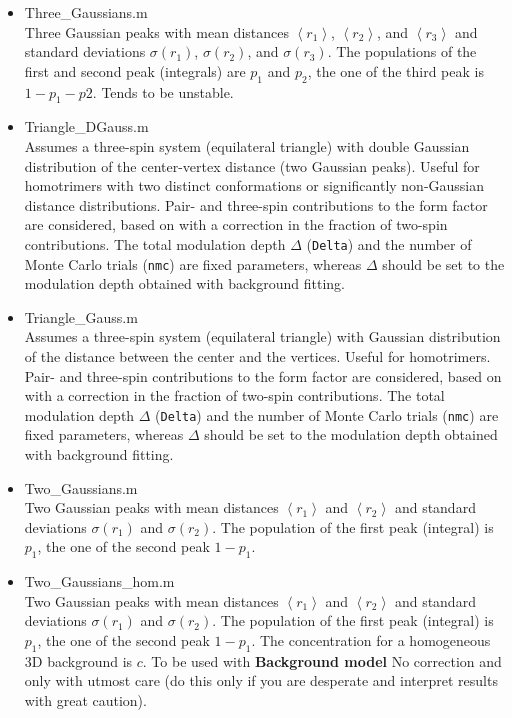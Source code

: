 \documentclass{article}
\begin{document}
\begin{itemize}
	\item {\ttfamily Three\_Gaussians.m} \\ Three Gaussian peaks with mean distances $\left\langle r_1 \right\rangle$, $\left\langle r_2 \right\rangle$, and $\left\langle r_3 \right\rangle$ and standard deviations $\sigma(r_1)$, $\sigma(r_2)$, and $\sigma(r_3)$. The populations of the first and second peak (integrals) are $p_1$ and $p_2$, the one of the third peak is $1-p_1 - p2$. Tends to be unstable.
  \item {\ttfamily Triangle\_DGauss.m} \\ Assumes a three-spin system (equilateral triangle) with double Gaussian distribution of the center-vertex distance (two Gaussian peaks). Useful for homotrimers with two distinct conformations or significantly non-Gaussian distance distributions. Pair- and three-spin contributions to the form factor are considered, based on \cite{jeschke2009} with a correction in the fraction of two-spin contributions. The total modulation depth $\Delta$ (\texttt{Delta}) and the number of Monte Carlo trials (\texttt{nmc}) are fixed parameters, whereas $\Delta$  should be set to the modulation depth obtained with background fitting.  
  \item {\ttfamily Triangle\_Gauss.m} \\ Assumes a three-spin system (equilateral triangle) with Gaussian distribution of the distance between the center and the vertices. Useful for homotrimers. Pair- and three-spin contributions to the form factor are considered, based on \cite{jeschke2009} with a correction in the fraction of two-spin contributions. The total modulation depth $\Delta$ (\texttt{Delta}) and the number of Monte Carlo trials (\texttt{nmc}) are fixed parameters, whereas $\Delta$  should be set to the modulation depth obtained with background fitting.
	\item {\ttfamily Two\_Gaussians.m} \\ Two Gaussian peaks with mean distances $\left\langle r_1 \right\rangle$ and $\left\langle r_2 \right\rangle$ and standard deviations $\sigma(r_1)$ and $\sigma(r_2)$. The population of the first peak (integral) is $p_1$, the one of the second peak $1-p_1$.
	\item {\ttfamily Two\_Gaussians\_hom.m} \\ Two Gaussian peaks with mean distances $\left\langle r_1 \right\rangle$ and $\left\langle r_2 \right\rangle$ and standard deviations $\sigma(r_1)$ and $\sigma(r_2)$. The population of the first peak (integral) is $p_1$, the one of the second peak $1-p_1$. The concentration for a homogeneous 3D background is $c$. To be used with {\bf Background model} {\ttfamily No correction} and only with utmost care (do this only if you are desperate and interpret results with great caution).

\end{itemize}
\end{document}

